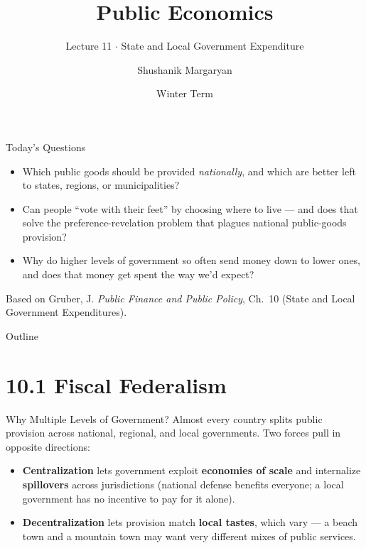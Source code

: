 \documentclass[11pt,aspectratio=169]{beamer}
\title{Public Economics}
\subtitle{Lecture 11 \(\cdot\) State and Local Government Expenditure}
\author{Shushanik Margaryan}
\institute{WU Vienna University of Economics and Business}
\date{Winter Term}
\begin{document}
\begin{frame}
  \titlepage
\end{frame}

\begin{frame}{Today's Questions}
  \begin{itemize}
    \item Which public goods should be provided \emph{nationally}, and which are better left to states, regions, or municipalities?
    \item Can people ``vote with their feet'' by choosing where to live --- and does that solve the preference-revelation problem that plagues national public-goods provision?
    \item Why do higher levels of government so often send money down to lower ones, and does that money get spent the way we'd expect?
  \end{itemize}
  \vspace{1em}
  \begin{block}{Based on}
    Gruber, J. \emph{Public Finance and Public Policy}, Ch.\ 10 (State and Local Government Expenditures).
  \end{block}
\end{frame}

\begin{frame}{Outline}
  \tableofcontents
\end{frame}

\section{10.1 Fiscal Federalism}

\begin{frame}{Why Multiple Levels of Government?}
  Almost every country splits public provision across national, regional, and local governments. Two forces pull in opposite directions:
  \begin{itemize}
    \item \textbf{Centralization} lets government exploit \textbf{economies of scale} and internalize \textbf{spillovers} across jurisdictions (national defense benefits everyone; a local government has no incentive to pay for it alone).
    \item \textbf{Decentralization} lets provision match \textbf{local tastes}, which vary --- a beach town and a mountain town may want very different mixes of public services.
  \end{itemize}
\end{frame}
\end{document}
